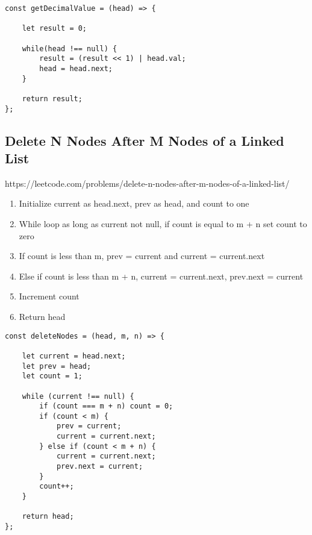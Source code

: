 \documentclass[10pt]{article}
\begin{document}
\begin{lstlisting}[title=Solution getDecimalValue, captionpos=t]
const getDecimalValue = (head) => {
    
    let result = 0;
    
    while(head !== null) {
        result = (result << 1) | head.val;
        head = head.next;
    }
    
    return result;
};
\end{lstlisting}
\medskip %













\pagebreak
\medskip   
\subsection {Delete N Nodes After M Nodes of a Linked List}
https://leetcode.com/problems/delete-n-nodes-after-m-nodes-of-a-linked-list/

\begin{enumerate}
	\item Initialize current as head.next, prev as head, and count to one
	\item While loop as long as current not null, if count is equal to m + n set count to zero
	\item If count is less than m, prev = current and current = current.next
	\item Else if count is less than m + n, current = current.next, prev.next = current
	\item Increment count
	\item Return head
\end{enumerate}

\begin{lstlisting}[title=Solution deleteNodes, captionpos=t]
const deleteNodes = (head, m, n) => {
    
    let current = head.next;
    let prev = head;
    let count = 1;
    
    while (current !== null) {
        if (count === m + n) count = 0;
        if (count < m) {
            prev = current;
            current = current.next;
        } else if (count < m + n) {
            current = current.next;
            prev.next = current;
        }
        count++;
    }
    
    return head;
};
\end{lstlisting}
\medskip %
\end{document}
